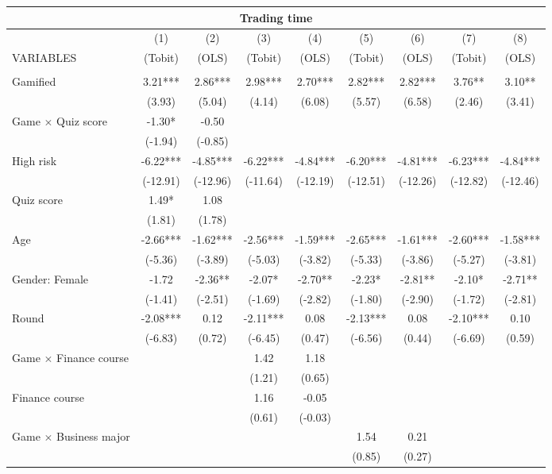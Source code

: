\documentclass[]{article}
\begin{document}
\begin{tabular}{lcccccccc}
\multicolumn{9}{c}{Trading time} \\ \hline
 & (1) & (2) & (3) & (4) & (5) & (6) & (7) & (8) \\
VARIABLES & (Tobit) & (OLS) & (Tobit) & (OLS) & (Tobit) & (OLS) & (Tobit) & (OLS) \\ \hline
 &  &  &  &  &  &  &  &  \\
Gamified & 3.21*** & 2.86*** & 2.98*** & 2.70*** & 2.82*** & 2.82*** & 3.76** & 3.10** \\
 & (3.93) & (5.04) & (4.14) & (6.08) & (5.57) & (6.58) & (2.46) & (3.41) \\
Game $\times$ Quiz score & -1.30* & -0.50 &  &  &  &  &  &  \\
 & (-1.94) & (-0.85) &  &  &  &  &  &  \\
High risk & -6.22*** & -4.85*** & -6.22*** & -4.84*** & -6.20*** & -4.81*** & -6.23*** & -4.84*** \\
 & (-12.91) & (-12.96) & (-11.64) & (-12.19) & (-12.51) & (-12.26) & (-12.82) & (-12.46) \\
Quiz score & 1.49* & 1.08 &  &  &  &  &  &  \\
 & (1.81) & (1.78) &  &  &  &  &  &  \\
Age & -2.66*** & -1.62*** & -2.56*** & -1.59*** & -2.65*** & -1.61*** & -2.60*** & -1.58*** \\
 & (-5.36) & (-3.89) & (-5.03) & (-3.82) & (-5.33) & (-3.86) & (-5.27) & (-3.81) \\
Gender: Female & -1.72 & -2.36** & -2.07* & -2.70** & -2.23* & -2.81** & -2.10* & -2.71** \\
 & (-1.41) & (-2.51) & (-1.69) & (-2.82) & (-1.80) & (-2.90) & (-1.72) & (-2.81) \\
Round & -2.08*** & 0.12 & -2.11*** & 0.08 & -2.13*** & 0.08 & -2.10*** & 0.10 \\
 & (-6.83) & (0.72) & (-6.45) & (0.47) & (-6.56) & (0.44) & (-6.69) & (0.59) \\
Game $\times$ Finance course &  &  & 1.42 & 1.18 &  &  &  &  \\
 &  &  & (1.21) & (0.65) &  &  &  &  \\
Finance course &  &  & 1.16 & -0.05 &  &  &  &  \\
 &  &  & (0.61) & (-0.03) &  &  &  &  \\
Game $\times$ Business major &  &  &  &  & 1.54 & 0.21 &  &  \\
 &  &  &  &  & (0.85) & (0.27) &  &  \\

\end{tabular}
\end{document}
